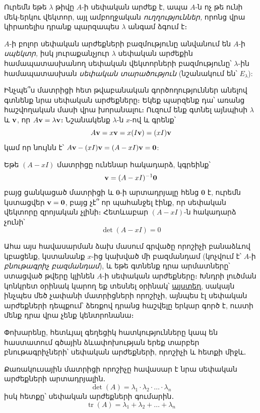 Ուրեմն եթե $\lambda$ թիվը $A$-ի սեփական արժեք է, ապա $A$-ն ոչ թե ունի մեկ-երկու վեկտոր, այլ ամբողջական \textit{ուղղություններ,} որոնց վրա կիրառելիս դրանք պարզապես $\lambda$ անգամ ձգում է։ 


$A$-ի բոլոր սեփական արժեքների բազմությունը անվանում են $A$-ի \textit{սպեկտր,} իսկ յուրաքանչյուր $\lambda$ սեփական արժեքին համապատասխանող սեփական վեկտորների բազմությունը՝ $\lambda$-ին համապատասխան \textit{սեփա\-կան տարածություն} (նշանակում են՝ $E_\lambda$):



Ինչպե՞ս մատրիցի հետ թվաբանական գործողություններ անելով գտնենք նրա սեփական արժեքները։ Եկեք պարզենք դա՝ առանց հաշվողական մասի վրա խորանալու։ Ուզում ենք գտնել այնպիսի $\lambda$ և $\mathbf{v}$, որ $A\mathbf{v}= \lambda \mathbf{v}$։ Նշանակենք $\lambda$-ն $x$-ով և գրենք՝
\[
A\mathbf{v}= x \mathbf{v} = x(I\mathbf{v}) = (xI)\mathbf{v}
\]
կամ որ նույնն է՝ $A\mathbf{v}-(xI)\mathbf{v} = (A-xI)\mathbf{v}= \mathbf{0}$:

Եթե $(A-xI)$ մատրիցը ունենար հակադարձ, կգրեինք՝
\[
\mathbf{v} = (A-xI)^{-1}\mathbf{0}
\]
բայց ցանկացած մատրիցի և $\mathbf{0}$-ի արտադրյալը հենց $\mathbf{0}$ է, ուրեմն կստացվեր $\mathbf{v} = \mathbf{0}$, բայց չէ՞ որ պահանջել էինք, որ սեփական վեկտորը զրոյական չլինի։ Հետևաբար $(A-xI)$-ն հակադարձ չունի՝
\[
\det(A-xI)=0
\]

Ահա այս հավասարման ձախ մասում գրվածը որոշիչի բանաձևով կբացենք, կստանանք $x$-ից կախված մի բազմանդամ (կոչվում է՝ $A$-ի \textit{բնութագրիչ բազմանդամ}), և եթե գտնենք դրա արմատները՝ ստացված թվերը կլինեն $A$-ի սեփական արժեքները։ Խնդրի լուծման կոնկրետ օրինակ կարող եք տեսնել օրինակ՝ \href{https://www.youtu.be/UVZ4kStUo1s}{այստեղ}, սակայն ինչպես մեծ չափանի մատրիցների որոշիչի, այնպես էլ սեփական արժեքների դեպքում՝ ձեռքով դրանց հաշվելը երկար գործ է, ուստի մենք դրա վրա չենք կենտրոնանա։

Փոխարենը, հետևյալ գեղեցիկ հատկությունները կապ են հաստատում գծային ձևափոխության երեք տարբեր բնութագրիչների՝ սեփական արժեքների, որոշիչի և հետքի միջև․
\begin{theorem}
Քառակուսային մատրիցի որոշիչը հավասար է նրա սեփական արժեքների արտադրյալին․
\[
\det(A) = \lambda_1 \cdot \lambda_2 \cdot \ldots \cdot \lambda_n
\]
իսկ  հետքը՝ սեփական արժեքների գումարին․
\[
\operatorname{tr}(A) = \lambda_1 + \lambda_2 + \ldots + \lambda_n
\]
\end{theorem}



